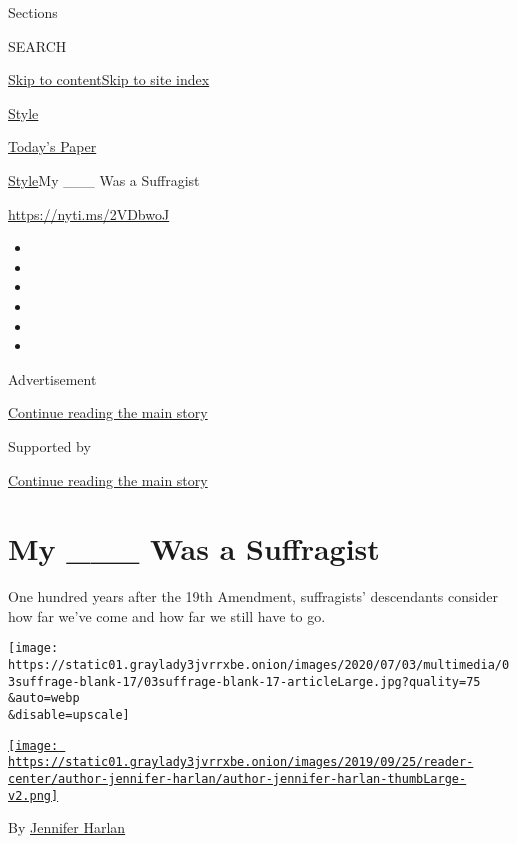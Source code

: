Sections

SEARCH

\protect\hyperlink{site-content}{Skip to
content}\protect\hyperlink{site-index}{Skip to site index}

\href{https://www.nytimes3xbfgragh.onion/section/style}{Style}

\href{https://myaccount.nytimes3xbfgragh.onion/auth/login?response_type=cookie\&client_id=vi}{}

\href{https://www.nytimes3xbfgragh.onion/section/todayspaper}{Today's
Paper}

\href{/section/style}{Style}\textbar{}My \_\_\_ Was a Suffragist

\url{https://nyti.ms/2VDbwoJ}

\begin{itemize}
\item
\item
\item
\item
\item
\item
\end{itemize}

Advertisement

\protect\hyperlink{after-top}{Continue reading the main story}

Supported by

\protect\hyperlink{after-sponsor}{Continue reading the main story}

\hypertarget{my-___-was-a-suffragist}{%
\section{My \_\_\_ Was a Suffragist}\label{my-___-was-a-suffragist}}

One hundred years after the 19th Amendment, suffragists' descendants
consider how far we've come and how far we still have to go.

\texttt{[image: https://static01.graylady3jvrrxbe.onion/images/2020/07/03/multimedia/03suffrage-blank-17/03suffrage-blank-17-articleLarge.jpg?quality=75\\\&auto=webp\\\&disable=upscale]}

\href{https://www.nytimes3xbfgragh.onion/by/jennifer-harlan}{\texttt{[image: https://static01.graylady3jvrrxbe.onion/images/2019/09/25/reader-center/author-jennifer-harlan/author-jennifer-harlan-thumbLarge-v2.png]}}

By \href{https://www.nytimes3xbfgragh.onion/by/jennifer-harlan}{Jennifer
Harlan}

